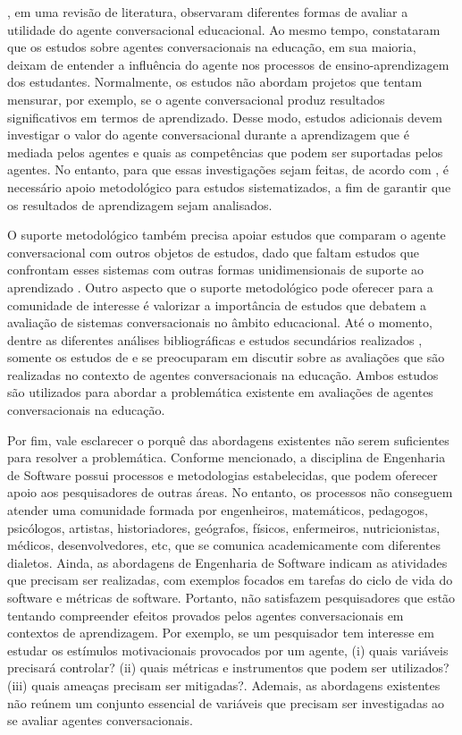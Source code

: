 , em uma revisão de literatura, observaram diferentes formas de avaliar a utilidade do agente conversacional educacional. Ao mesmo tempo, constataram que os estudos sobre agentes conversacionais na educação, em sua maioria, deixam de entender a influência do agente nos processos de ensino-aprendizagem dos estudantes. Normalmente, os estudos não abordam projetos que tentam mensurar, por exemplo, se o agente conversacional produz resultados significativos em termos de aprendizado. Desse modo, estudos adicionais devem investigar o valor do agente conversacional durante a aprendizagem que é mediada pelos agentes e quais as competências que podem ser suportadas pelos agentes. No entanto, para que essas investigações sejam feitas, de acordo com , é necessário apoio metodológico para estudos sistematizados, a fim de garantir que os resultados de aprendizagem sejam analisados. 

O suporte metodológico também precisa apoiar estudos que comparam o agente conversacional com outros objetos de estudos, dado que faltam estudos que confrontam esses sistemas com outras formas unidimensionais de suporte ao aprendizado \cite{hobert2019}. Outro aspecto que o suporte metodológico pode oferecer para a comunidade de interesse é valorizar a importância de estudos que debatem a avaliação de sistemas conversacionais no âmbito educacional. Até o momento, dentre as diferentes análises bibliográficas e estudos secundários realizados \cite{io2017, bernardini2018, kuyven2018, roos2018, SMUTNY2020103862, Paschoal:2020FIE}, somente os estudos de \cite{winkler2018} e  se preocuparam em discutir sobre as avaliações que são realizadas no contexto de agentes conversacionais na educação. Ambos estudos são utilizados para abordar a problemática existente em avaliações de agentes conversacionais na educação. 

Por fim, vale esclarecer o porquê das abordagens existentes não serem suficientes para resolver a problemática. Conforme mencionado, a disciplina de Engenharia de Software possui processos e metodologias estabelecidas, que podem oferecer apoio aos pesquisadores de outras áreas. No entanto, os processos não conseguem atender uma comunidade formada por engenheiros, matemáticos, pedagogos, psicólogos, artistas, historiadores, geógrafos, físicos, enfermeiros, nutricionistas, médicos, desenvolvedores, etc, que se comunica academicamente com diferentes dialetos. Ainda, as abordagens de Engenharia de Software indicam as atividades que precisam ser realizadas, com exemplos focados em tarefas do ciclo de vida do software e métricas de software. Portanto, não satisfazem pesquisadores que estão tentando compreender efeitos provados pelos agentes conversacionais em contextos de aprendizagem. Por exemplo, se um pesquisador tem interesse em estudar os estímulos motivacionais provocados por um agente, (i) quais variáveis precisará controlar? (ii) quais métricas e instrumentos que podem ser utilizados? (iii) quais ameaças precisam ser mitigadas?. Ademais, as abordagens existentes não reúnem um conjunto essencial de variáveis que precisam ser investigadas ao se avaliar agentes conversacionais. 


